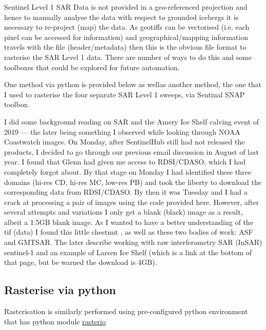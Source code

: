 \documentclass[11pt]{article}
\begin{document}
Sentinel Level 1 SAR Data is not provided in a geo-referenced
projection and hence to manually analyse the data with respect to grounded
icebergs it is necessary to re-project (map) the data. As geotiffs
can be vectorised (i.e. each pixel can be accessed for information)
and geographical/mapping information travels with the file
(header/metadata) then this is the obvious file format to rasterise
the SAR Level 1 data. There are number of ways to do this and some
toolboxes that could be explored for future automation.

One method via python is provided below as wellas another method,
the one that I used to rasterise the four separate SAR Level 1
sweeps, via Sentinal SNAP toolbox.

I did some background reading on SAR and the Amery Ice Shelf calving event of
2019 — the later being something I observed while looking through NOAA
Coastwatch images. On Monday, after SentinelHub still had not released
the products, I decided to go through our previous email discussion in
August of last year. I found that Glenn had given me access to
RDSI/CDASO, which I had completely forgot about. By that stage on
Monday I had identified these three domains (hi-res CD, hi-res MC,
low-res PB) and took the liberty to download the corresponding data
from RDSI/CDASO. By then it was Tuesday and I had a crack at
processing a pair of images using the code provided here. However,
after several attempts and variations I only get a blank (black) image
as a result, albeit a 1.5GB blank image. As I wanted to have a better
understanding of the tif (data) I found this little chestnut , as well
as these two bodies of work: ASF and GMTSAR. The later describe
working with raw interferometry SAR (InSAR) sentinel-1 and an example
of Larsen Ice Shelf (which is a link at the bottom of that page, but
be warned the download is 4GB). 

\subsection{Rasterise via python}
\label{sec:orgb418e77}

Rasterisation is similarly performed using pre-configured python environment that has python
module \href{https://rasterio.readthedocs.io/en/latest/}{rasterio}
\end{document}
